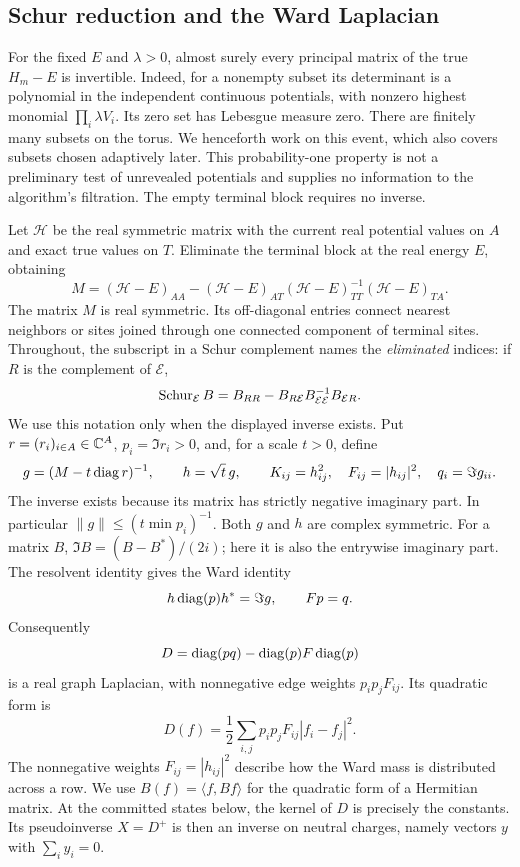 \subsection{Schur reduction and the Ward Laplacian}

For the fixed $E$ and $\lambda>0$, almost surely every principal matrix
of the true $H_m-E$ is invertible. Indeed, for a nonempty subset its
determinant is a polynomial in the independent continuous potentials,
with nonzero highest monomial $\prod_{i}\lambda V_i$. Its zero set has
Lebesgue measure zero. There are finitely many subsets on the torus.
We henceforth work on this event, which also covers subsets chosen
adaptively later. This probability-one property is not a preliminary
test of unrevealed potentials and supplies no information to the
algorithm's filtration. The empty terminal block requires no inverse.

Let $\mathcal H$ be the real symmetric matrix with the current real
potential values on $A$ and exact true values on $T$. Eliminate the terminal
block at the real energy $E$, obtaining
\[
 M=(\mathcal H-E)_{AA}
   -(\mathcal H-E)_{AT}(\mathcal H-E)_{TT}^{-1}
                         (\mathcal H-E)_{TA}.
\]
The matrix $M$ is real symmetric. Its off-diagonal entries connect
nearest neighbors or sites joined through one connected component
of terminal sites. Throughout, the subscript in a Schur complement
names the \emph{eliminated} indices: if $R$ is the complement of $\mathcal E$,
\[
 \operatorname{Schur}_{\mathcal E} B
 =B_{RR}-B_{R\mathcal E}B_{\mathcal E\mathcal E}^{-1}B_{\mathcal ER}.
\]
We use this notation only when the displayed inverse exists.
Put $r=(r_i)_{i\in A}\in\mathbb C^A$, $p_i=\Im r_i>0$,
and, for a scale $t>0$, define
\[
 g=(M-t\operatorname{diag} r)^{-1},\qquad h=\sqrt t\,g,\qquad
 K_{ij}=h_{ij}^2,\quad F_{ij}=|h_{ij}|^2,\quad q_i=\Im g_{ii}.
\]
The inverse exists because its matrix has strictly negative imaginary
part. In particular $\|g\|\le(t\min p_i)^{-1}$.
Both $g$ and $h$ are complex symmetric. For a matrix $B$,
$\Im B=(B-B^*)/(2i)$; here it is also the entrywise imaginary part.
The resolvent identity gives the Ward identity
\begin{equation}\label{eq:ward}
 h\operatorname{diag}(p)h^*=\Im g,\qquad Fp=q.
\end{equation}
Consequently
\[
 D=\operatorname{diag}(pq)-\operatorname{diag}(p)F\operatorname{diag}(p)
\]
is a real graph Laplacian, with nonnegative edge weights
$p_i p_jF_{ij}$. Its quadratic form is
\[
 D(f)=\frac12\sum_{i,j}p_i p_jF_{ij}|f_i-f_j|^2.
\]
The nonnegative weights $F_{ij}=|h_{ij}|^2$ describe how the Ward mass is
distributed across a row.
We use $B(f)=\langle f,Bf\rangle$ for the quadratic form of a Hermitian
matrix. At the committed states below, the kernel of $D$ is precisely
the constants. Its pseudoinverse $X=D^+$ is then an inverse on neutral
charges, namely vectors $y$ with $\sum_i y_i=0$.

